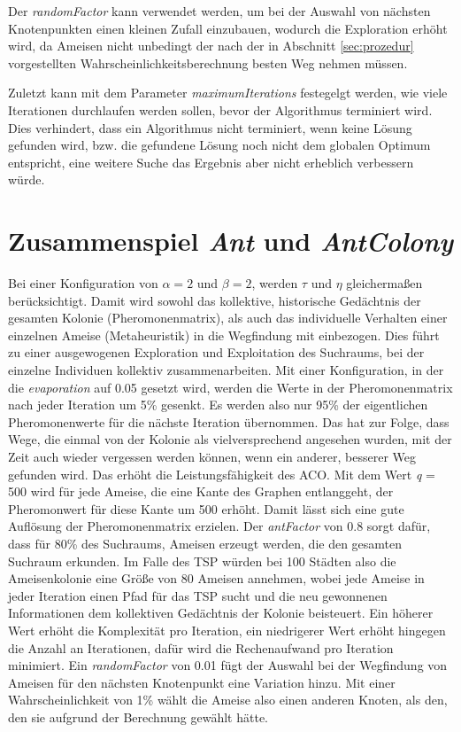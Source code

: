 Der \emph{randomFactor} kann verwendet werden, um bei der Auswahl von
nächsten Knotenpunkten einen kleinen Zufall einzubauen, wodurch die Exploration
erhöht wird, da Ameisen nicht unbedingt der nach der in Abschnitt
\ref{sec:prozedur} vorgestellten Wahrscheinlichkeitsberechnung besten Weg
nehmen müssen.

Zuletzt kann mit dem Parameter \emph{maximumIterations} festegelgt werden,
wie viele Iterationen durchlaufen werden sollen, bevor der Algorithmus
terminiert wird. Dies verhindert, dass ein Algorithmus nicht terminiert, wenn
keine Lösung gefunden wird, bzw. die gefundene Lösung noch nicht dem globalen
Optimum entspricht, eine weitere Suche das Ergebnis aber nicht erheblich
verbessern würde.

\section{Zusammenspiel \emph{Ant} und \emph{AntColony}}

Bei einer Konfiguration von $\alpha = 2$ und $\beta = 2$, werden $\tau$ und
$\eta$ gleichermaßen berücksichtigt. Damit wird sowohl das kollektive,
historische Gedächtnis der gesamten Kolonie (Pheromonenmatrix), als auch
das individuelle Verhalten einer einzelnen Ameise (Metaheuristik) in die
Wegfindung mit einbezogen. Dies führt zu einer
ausgewogenen Exploration und Exploitation des Suchraums, bei der einzelne
Individuen kollektiv zusammenarbeiten. Mit einer
Konfiguration, in der die \emph{evaporation} auf 0.05 gesetzt wird, werden
die Werte in der Pheromonenmatrix nach jeder Iteration um 5\% gesenkt. Es
werden also nur 95\% der eigentlichen Pheromonenwerte für die nächste
Iteration übernommen. Das hat zur Folge, dass Wege, die einmal von der
Kolonie als vielversprechend angesehen wurden, mit der Zeit auch wieder
vergessen werden können, wenn ein anderer, besserer Weg gefunden wird. Das
erhöht die Leistungsfähigkeit des ACO. Mit dem Wert \emph{q} = 500 wird für
jede Ameise,
die eine Kante des Graphen entlanggeht, der Pheromonwert für diese Kante um
500 erhöht. Damit lässt sich eine gute Auflösung der Pheromonenmatrix
erzielen. Der \emph{antFactor} von 0.8 sorgt dafür, dass für 80\% des
Suchraums, Ameisen erzeugt werden, die den gesamten Suchraum erkunden. Im
Falle des TSP würden bei 100 Städten also die Ameisenkolonie eine Größe von
80 Ameisen annehmen, wobei
jede Ameise in jeder Iteration einen Pfad für das TSP sucht und die neu
gewonnenen Informationen dem kollektiven Gedächtnis der Kolonie beisteuert.
Ein höherer Wert erhöht die Komplexität pro Iteration, ein niedrigerer Wert
erhöht hingegen die Anzahl an Iterationen, dafür wird die Rechenaufwand pro
Iteration minimiert.
Ein \emph{randomFactor} von 0.01 fügt der Auswahl bei der Wegfindung von
Ameisen für den nächsten Knotenpunkt eine Variation hinzu. Mit einer
Wahrscheinlichkeit von 1\% wählt die Ameise also einen anderen Knoten, als
den, den sie aufgrund der Berechnung gewählt hätte.
